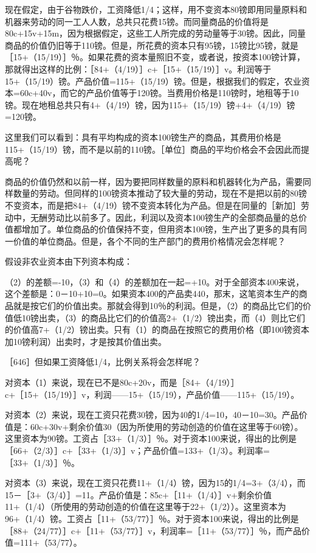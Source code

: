 现在假定，由于谷物跌价，工资降低1/4；这样，用不变资本80镑即用同量原料和机器来劳动的同一工人人数，总共只花费15镑。而同量商品的价值将是80c+15v+15m，因为根据假定，这些工人所完成的劳动量等于30镑。因此，同量商品的价值仍旧等于110镑。但是，所花费的资本只有95镑，15镑比95镑，就是［15+（15/19）］％。如果花费的资本量照旧不变，或者说，按资本100镑计算，那就得出这样的比例：［84+（4/19）］c+［15+（15/19）］v。利润等于15+（15/19）镑。产品价值=115+（15/19）镑。但是，根据我们的假定，农业资本=60c+40v，而它的产品价值等于120镑。当费用价格是110镑时，地租等于10镑。现在地租总共只有4+（4/19）镑，因为115+（15/19）镑+4+（4/19）镑=120镑。

这里我们可以看到：具有平均构成的资本100镑生产的商品，其费用价格是115+（15/19）镑，而不是以前的110镑。［单位］商品的平均价格会不会因此而提高呢？

商品的价值仍然和以前一样，因为要把同样数量的原料和机器转化为产品，需要同样数量的劳动。但同样的100镑资本推动了较大量的劳动，现在不是把以前的80镑不变资本，而是把84+（4/19）镑不变资本转化为产品。但是在同量的［新加］劳动中，无酬劳动比以前多了。因此，利润以及资本100镑生产的全部商品量的总价值都增加了。单位商品的价值保持不变，但用资本100镑，生产出了更多的具有同一价值的单位商品。但是，各个不同的生产部门的费用价格情况会怎样呢？

假设非农业资本由下列资本构成：

\todo{}

（2）的差额=-10，（3）和（4）的差额加在一起=+10。对于全部资本400来说，这个差额是：0－10+10=0。如果资本400的产品卖440，那末，这笔资本生产的商品就是按它们的价值出卖。那就会得到10％的利润。但是，（2）的商品比它们的价值低10镑出卖，（3）的商品比它们的价值高2+（1/2）镑出卖，而（4）则比它们的价值高7+（1/2）镑出卖。只有（1）的商品在按照它的费用价格（即100镑资本加10镑利润）出卖时，才是按其价值出卖。

［646］但如果工资降低1/4，比例关系将会怎样呢？

对资本（1）来说，现在已不是80c+20v，而是［84+（4/19）］c+［15+（15/19）］v，利润——15+（15/19），产品价值——115+（15/19）。

对资本（2）来说，现在工资只花费30镑，因为40的1/4=10，40－10=30。产品价值是：60c+30v+剩余价值30（因为所使用的劳动创造的价值在这里等于60镑）。这里资本为90镑。工资占［33+（1/3）］％。对于资本100来说，得出的比例是［66+（2/3）］c+［33+（1/3）］v；产品价值=133+（1/3）。利润率=［33+（1/3）］％。

对资本（3）来说，现在工资只花费11+（1/4）镑，因为15的1/4=3+（3/4），而15－［3+（3/4）］=11。产品价值是：85c+［11+（1/4）］v+剩余价值11+（1/4）（所使用的劳动创造的价值在这里等于22+（1/2））。这里资本为96+（1/4）镑。工资占［11+（53/77）］％。对于资本100来说，得出的比例是［88+（24/77）］c+［11+（53/77）］v，利润率=［11+（53/77）］％，而产品价值=111+（53/77）。

